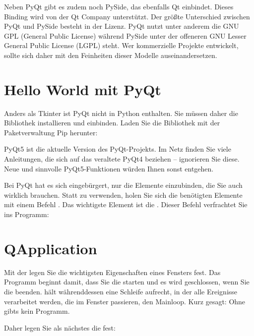 Neben PyQt gibt es zudem noch PySide, das ebenfalls Qt einbindet. Dieses Binding wird von der Qt Company unterstützt. Der größte Unterschied zwischen PyQt und PySide besteht in der Lizenz. PyQt nutzt unter anderem die GNU GPL (General Public License) während PySide unter der offeneren GNU Lesser General Public License (LGPL) steht. Wer kommerzielle Projekte entwickelt, sollte sich daher mit den Feinheiten dieser Modelle auseinandersetzen.
    
\section{Hello World mit PyQt}

Anders als Tkinter ist PyQt nicht in Python enthalten. Sie müssen daher die Bibliothek installieren und einbinden. Laden Sie die Bibliothek mit der Paketverwaltung Pip herunter:
 
\medskip
   

\medskip

PyQt5 ist die aktuelle Version des PyQt-Projekts. Im Netz finden Sie viele Anleitungen, die sich auf das veraltete PyQt4 beziehen -- ignorieren Sie diese. Neue und sinnvolle PyQt5-Funktionen würden Ihnen sonst entgehen.
    
Bei PyQt hat es sich eingebürgert, nur die Elemente einzubinden, die Sie auch wirklich brauchen. Statt  zu verwenden, holen Sie sich die benötigten Elemente mit einem Befehl . Das wichtigste Element ist die . Dieser Befehl verfrachtet Sie ins Programm:
    
\medskip


\section{QApplication}

Mit der  legen Sie die wichtigsten Eigenschaften eines Fensters fest. Das Programm beginnt damit, dass Sie die  starten und es wird geschlossen, wenn Sie die  beenden.  hält währenddessen eine Schleife aufrecht, in der alle Ereignisse verarbeitet werden, die im Fenster passieren, den Mainloop. Kurz gesagt: Ohne  gibts kein Programm.
    
Daher legen Sie als nächstes die  fest:
    
